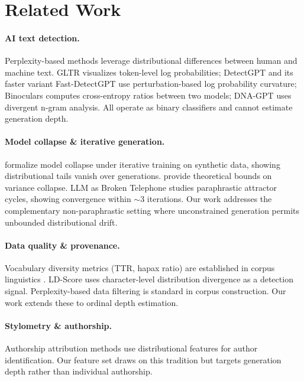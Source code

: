 \documentclass[11pt,twocolumn]{article}
\begin{document}
\section{Related Work}

\paragraph{AI text detection.}
Perplexity-based methods leverage distributional differences between human and machine text.
GLTR \citep{gehrmann2019gltr} visualizes token-level log probabilities;
DetectGPT \citep{mitchell2023detectgpt} and its faster variant Fast-DetectGPT \citep{bao2024fast} use perturbation-based log probability curvature;
Binoculars \citep{hans2024spotting} computes cross-entropy ratios between two models;
DNA-GPT \citep{yang2024dna} uses divergent n-gram analysis.
All operate as binary classifiers and cannot estimate generation depth.

\paragraph{Model collapse \& iterative generation.}
\citet{shumailov2024model} formalize model collapse under iterative training on synthetic data, showing distributional tails vanish over generations.
\citet{dohmatob2024tale} provide theoretical bounds on variance collapse.
LLM as Broken Telephone \citep{briakou2025llm} studies paraphrastic attractor cycles, showing convergence within $\sim$3 iterations.
Our work addresses the complementary non-paraphrastic setting where unconstrained generation permits unbounded distributional drift.

\paragraph{Data quality \& provenance.}
Vocabulary diversity metrics (TTR, hapax ratio) are established in corpus linguistics \citep{mccarthy2010mtld}.
LD-Score \citep{tulchinskii2024intrinsic} uses character-level distribution divergence as a detection signal.
Perplexity-based data filtering \citep{wenzek2020ccnet} is standard in corpus construction.
Our work extends these to ordinal depth estimation.

\paragraph{Stylometry \& authorship.}
Authorship attribution methods \citep{neal2017surveying} use distributional features for author identification.
Our feature set draws on this tradition but targets generation depth rather than individual authorship.
\end{document}
